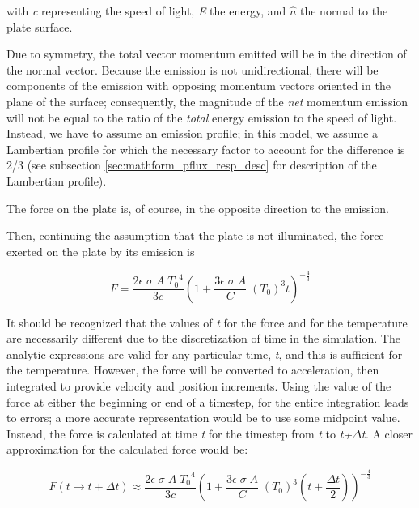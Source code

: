       with \textit{c} representing the speed of light,
      \textit{E} the energy, and  $\hat{n}$ the normal to the plate surface.


      Due to symmetry, the total vector momentum emitted will be in the
      direction of the normal vector. Because the emission is not
      unidirectional, there will be components of the emission with
      opposing momentum vectors oriented in the plane of the
      surface; consequently, the magnitude of the \textit{net}
      momentum emission will not be equal to the ratio of the
      \textit{total} energy emission to the speed
      of light.  Instead, we have to assume an emission profile; in
      this model, we assume a Lambertian profile for which the necessary factor
      to account for the difference is 2/3 (see subsection
      \ref{sec:mathform_pflux_resp_desc} for description
      of the Lambertian profile).

      The force on the plate is, of course, in the opposite direction to the
      emission.

      Then, continuing the assumption that the plate is not
      illuminated, the force exerted on the plate by its emission is

      \begin{equation}
         F=\frac{2\epsilon \;\sigma
         \;A\;{T_{0}}^{4}}{3c}\left(1+\frac{3\epsilon \;\sigma
         \;A}{C}\;(T_{0})^{3}t\right)^{-{\frac{4}{3}}}
      \end{equation}

      It should be recognized that the values of \textit{t} for the force and
      for the temperature are necessarily different due to the discretization
      of time in the simulation. The analytic expressions are valid for any
      particular time, \textit{t}, and this is sufficient for the
      temperature.  However, the force will be converted to acceleration,
      then integrated to provide velocity and position increments.
      Using the value of the force at either the beginning or end of a
      timestep, for the entire integration leads to errors; a more accurate
      representation would be to use some midpoint value. Instead, the
      force is
      calculated at time \textit{t} for the timestep from \textit{t
      }to\textit{ t+}\textit{${\Delta}$}\textit{t. } A closer
      approximation for the calculated force would be:

      \begin{equation}
        F(t\rightarrow t+\Delta t)\approx \frac{2\epsilon \;\sigma
        \;A\;{T_{0}}^{4}}{3c}\left(1+\frac{3\epsilon \;\sigma
        \;A}{C}\;(T_{0})^{3}\left(t+\frac{\Delta
        t}{2}\right)\right)^{-{\frac{4}{3}}}
      \end{equation}

